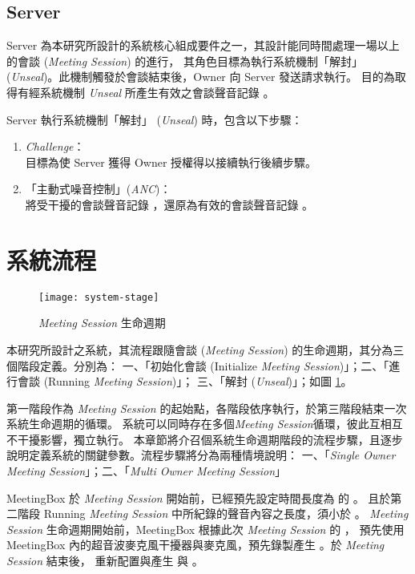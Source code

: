 \subsection{Server}

    Server 為本研究所設計的系統核心組成要件之一，其設計能同時間處理一場以上的會談 ({\it Meeting Session}) 的進行，
其角色目標為執行系統機制「解封」 ({\it Unseal})。此機制觸發於會談結束後，Owner 向 Server 發送請求執行。
目的為取得有經系統機制 {\it Unseal} 所產生有效之會談聲音記錄 \DEFrecREV。

    Server 執行系統機制「解封」 ({\it Unseal}) 時，包含以下步驟：
    \begin{enumerate}[itemsep=0pt,parsep=0pt,]
        \item {\it Challenge}： \\
            目標為使 Server 獲得 Owner 授權得以接續執行後續步驟。
        \item 「主動式噪音控制」({\it ANC})： \\
            將受干擾的會談聲音記錄 \DEFrecJ，還原為有效的會談聲音記錄 \DEFrecREV。
    \end{enumerate}


\section{系統流程}

\begin{figure}[H]
    \centering
    \texttt{[image: system-stage]}
    \caption{{\it Meeting Session} 生命週期}
    \label{fig.system-stage}
\end{figure}

    本研究所設計之系統，其流程跟隨會談 ({\it Meeting Session}) 的生命週期，其分為三個階段定義。分別為：
一、「初始化會談 (Initialize {\it Meeting Session})」；二、「進行會談 (Running {\it Meeting Session})」；
三、「解封 ({\it Unseal})」；如圖 \ref{fig.system-stage}。

    第一階段作為 {\it Meeting Session} 的起始點，各階段依序執行，於第三階段結束一次系統生命週期的循環。
系統可以同時存在多個{\it Meeting Session}循環，彼此互相互不干擾影響，獨立執行。
本章節將介召個系統生命週期階段的流程步驟，且逐步說明定義系統的關鍵參數。流程步驟將分為兩種情境說明：
一、「{\it Single Owner Meeting Session}」；二、「{\it Multi Owner Meeting Session}」

    MeetingBox 於 {\it Meeting Session} 開始前，已經預先設定時間長度為 \DEFtimeMAX 的 \DEFrecN。
且於第二階段 Running {\it Meeting Session} 中所紀錄的聲音內容之長度，須小於  \DEFtimeMAX。
{\it Meeting Session} 生命週期開始前，MeetingBox 根據此次 {\it Meeting Session} 的 \DEFseed，
預先使用 MeetingBox 內的超音波麥克風干擾器與麥克風，預先錄製產生 \DEFrecN。於 {\it Meeting Session} 結束後，
重新配置與產生 \DEFseed 與 \DEFrecN。


